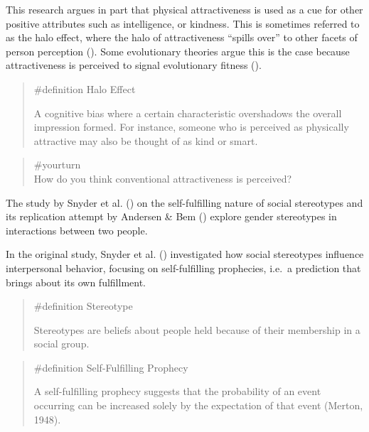 \documentclass[
  letterpaper,
]{book}
\begin{document}
This research argues in part that physical attractiveness is used as a
cue for other positive attributes such as intelligence, or kindness.
This is sometimes referred to as the halo effect, where the halo of
attractiveness ``spills over'' to other facets of person perception
(). Some
evolutionary theories argue this is the case because attractiveness is
perceived to signal evolutionary fitness
().

\begin{quote}
\label{def-haloeffect}{\#definition} Halo Effect

A cognitive bias where a certain characteristic overshadows the overall
impression formed. For instance, someone who is perceived as physically
attractive may also be thought of as kind or smart.
\end{quote}

\begin{quote}
{\#yourturn}\\
How do you think conventional attractiveness is perceived?
\end{quote}

The study by Snyder et al. () on
the self-fulfilling nature of social stereotypes and its replication
attempt by Andersen \& Bem ()
explore gender stereotypes in interactions between two people.

In the original study, Snyder et al.
() investigated how social
stereotypes influence interpersonal behavior, focusing on
self-fulfilling prophecies, i.e.~a prediction that brings about its own
fulfillment.

\begin{quote}
\label{def-stereotype}{\#definition} Stereotype

Stereotypes are beliefs about people held because of their membership in
a social group.
\end{quote}

\begin{quote}
\label{def-selffulfillingprophecy}{\#definition}
Self-Fulfilling Prophecy

A self-fulfilling prophecy suggests that the probability of an event
occurring can be increased solely by the expectation of that event
(Merton, 1948).
\end{quote}
\end{document}
